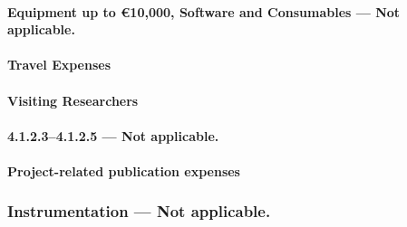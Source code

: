 \documentclass{dfg_en}
\newcommand{\emptyheading}{ \mdseries--- Not applicable.}
\begin{document}
\paragraph{Equipment up to €10,000, Software and Consumables\emptyheading}
%

\paragraph{Travel Expenses}


\paragraph{Visiting Researchers}


\paragraph*{4.1.2.3--4.1.2.5\emptyheading}

%
%
\setcounter{paragraph}{5}
\paragraph{Project-related publication expenses}
% 

\subsubsection{Instrumentation\emptyheading}

%
%
\end{document}
